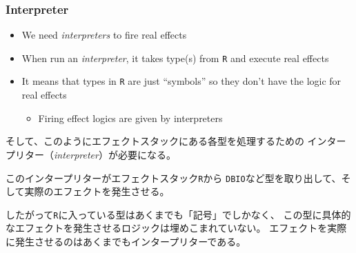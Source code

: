 \begin{frame}
  \frametitle{Interpreter}

  \pause
  \begin{itemize}
    \item<+-> We need \emph{interpreters} to fire real effects

    \item<+-> When run an \emph{interpreter},
    it takes type(s) from \lstinline|R| and execute real effects
    \begin{center}
    \end{center}

    \item<+-> It means that types in \lstinline|R| are just ``symbols''
    so they don't have the logic for real effects
    \begin{itemize}
      \item Firing effect logics are given by interpreters
    \end{itemize}
  \end{itemize}

  \begin{notes}
    \item そして、このようにエフェクトスタックにある各型を処理するための
    インタープリター（\emph{interpreter}）が必要になる。

    \item このインタープリターがエフェクトスタック\lstinline|R|から
    \lstinline|DBIO|など型を取り出して、そして実際のエフェクトを発生させる。

    \item したがって\lstinline|R|に入っている型はあくまでも「記号」でしかなく、
    この型に具体的なエフェクトを発生させるロジックは埋めこまれていない。
    エフェクトを実際に発生させるのはあくまでもインタープリターである。
  \end{notes}
\end{frame}

